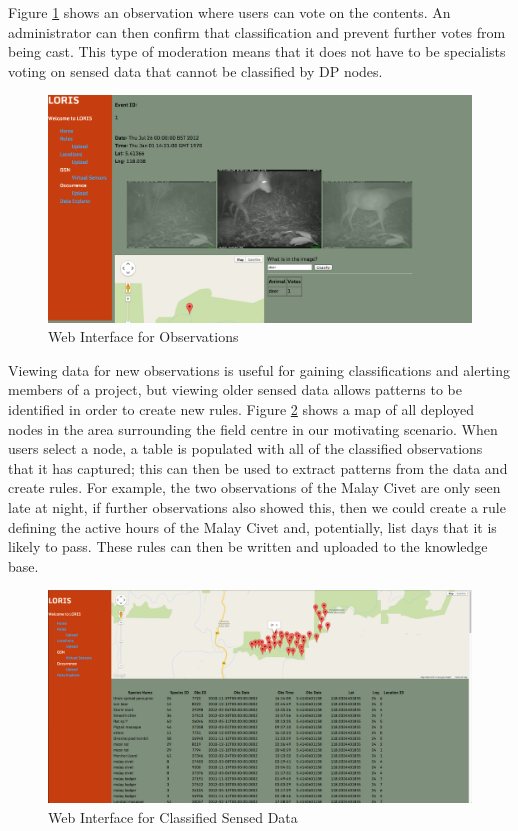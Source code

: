 		Figure \ref{kc:loris} shows an observation where users can vote on the contents. An administrator can then confirm that classification and prevent further votes from being cast. This type of moderation means that it does not have to be specialists voting on sensed data that cannot be classified by DP nodes.
		
		\begin{figure}[h]
		\centering
		\includegraphics[width=\textwidth]{Chap4/figures/loris}
		\caption{Web Interface for Observations}
		\label{kc:loris}
		\end{figure}
		
		Viewing data for new observations is useful for gaining classifications and alerting members of a project, but viewing older sensed data allows patterns to be identified in order to create new rules. Figure \ref{kc:loris_data} shows a map of all deployed nodes in the area surrounding the field centre in our motivating scenario. When users select a node, a table is populated with all of the classified observations that it has captured; this can then be used to extract patterns from the data and create rules. For example, the two observations of the Malay Civet are only seen late at night, if further observations also showed this, then we could create a rule defining the active hours of the Malay Civet and, potentially, list days that it is likely to pass. These rules can then be written and uploaded to the knowledge base.
		\begin{figure}[h]
		\centering
		\includegraphics[width=\textwidth]{Chap4/figures/loris_data}
		\caption{Web Interface for Classified Sensed Data}
		\label{kc:loris_data}
		\end{figure}

